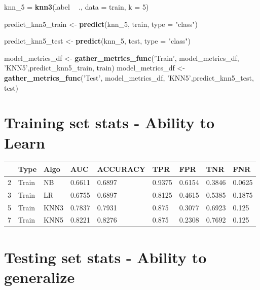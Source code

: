 \documentclass[
]{article}
\newenvironment{Shaded}{\begin{snugshade}}{\end{snugshade}}
\newcommand{\DataTypeTok}[1]{\textcolor[rgb]{0.13,0.29,0.53}{#1}}
\newcommand{\DecValTok}[1]{\textcolor[rgb]{0.00,0.00,0.81}{#1}}
\newcommand{\KeywordTok}[1]{\textcolor[rgb]{0.13,0.29,0.53}{\textbf{#1}}}
\newcommand{\NormalTok}[1]{#1}
\newcommand{\OperatorTok}[1]{\textcolor[rgb]{0.81,0.36,0.00}{\textbf{#1}}}
\newcommand{\StringTok}[1]{\textcolor[rgb]{0.31,0.60,0.02}{#1}}
\begin{document}
\begin{Shaded}
\begin{Highlighting}[]
\NormalTok{knn_}\DecValTok{5}\NormalTok{ =}\StringTok{ }\KeywordTok{knn3}\NormalTok{(label }\OperatorTok{~}\StringTok{ }\NormalTok{., }\DataTypeTok{data =}\NormalTok{ train, }\DataTypeTok{k =} \DecValTok{5}\NormalTok{)}

\NormalTok{predict_knn5_train <-}\StringTok{ }\KeywordTok{predict}\NormalTok{(knn_}\DecValTok{5}\NormalTok{, train, }\DataTypeTok{type =} \StringTok{"class"}\NormalTok{)}

\NormalTok{predict_knn5_test <-}\StringTok{ }\KeywordTok{predict}\NormalTok{(knn_}\DecValTok{5}\NormalTok{, test, }\DataTypeTok{type =} \StringTok{"class"}\NormalTok{)}

\NormalTok{model_metrics_df <-}\StringTok{ }\KeywordTok{gather_metrics_func}\NormalTok{(}\StringTok{'Train'}\NormalTok{, model_metrics_df, }\StringTok{'KNN5'}\NormalTok{,predict_knn5_train, train)}
\NormalTok{model_metrics_df <-}\StringTok{ }\KeywordTok{gather_metrics_func}\NormalTok{(}\StringTok{'Test'}\NormalTok{, model_metrics_df, }\StringTok{'KNN5'}\NormalTok{,predict_knn5_test, test)}
\end{Highlighting}
\end{Shaded}

\hypertarget{training-set-stats---ability-to-learn}{%
\section{Training set stats - Ability to
Learn}\label{training-set-stats---ability-to-learn}}

\begin{table}[H]
\centering
\begin{tabular}[t]{l|l|l|l|l|l|l|l|l}
\hline
  & Type & Algo & AUC & ACCURACY & TPR & FPR & TNR & FNR\\
\hline
2 & Train & NB & 0.6611 & 0.6897 & 0.9375 & 0.6154 & 0.3846 & 0.0625\\
\hline
3 & Train & LR & 0.6755 & 0.6897 & 0.8125 & 0.4615 & 0.5385 & 0.1875\\
\hline
5 & Train & KNN3 & 0.7837 & 0.7931 & 0.875 & 0.3077 & 0.6923 & 0.125\\
\hline
7 & Train & KNN5 & 0.8221 & 0.8276 & 0.875 & 0.2308 & 0.7692 & 0.125\\
\hline
\end{tabular}
\end{table}

\hypertarget{testing-set-stats---ability-to-generalize}{%
\section{Testing set stats - Ability to
generalize}\label{testing-set-stats---ability-to-generalize}}
\end{document}
